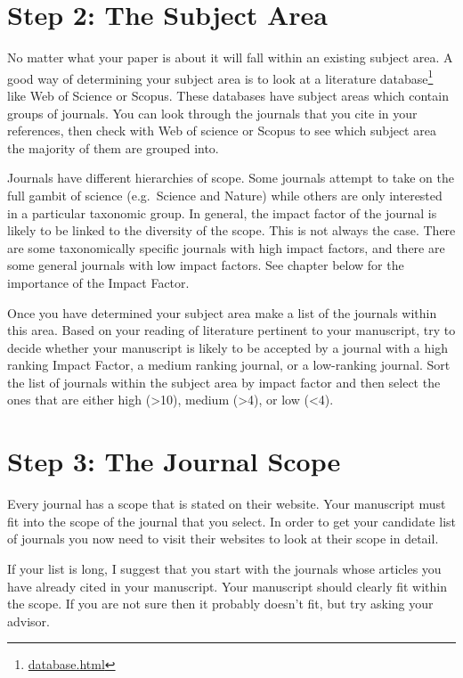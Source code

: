 \documentclass[
]{krantz}
\renewcommand{\href}[2]{#2\footnote{\url{#1}}}
\begin{document}
\hypertarget{step-2-the-subject-area}{%
\section{Step 2: The Subject Area}\label{step-2-the-subject-area}}

No matter what your paper is about it will fall within an existing subject area. A good way of determining your subject area is to look at a \href{database.html}{literature database} like Web of Science or Scopus. These databases have subject areas which contain groups of journals. You can look through the journals that you cite in your references, then check with Web of science or Scopus to see which subject area the majority of them are grouped into.

Journals have different hierarchies of scope. Some journals attempt to take on the full gambit of science (e.g.~Science and Nature) while others are only interested in a particular taxonomic group. In general, the impact factor of the journal is likely to be linked to the diversity of the scope. This is not always the case. There are some taxonomically specific journals with high impact factors, and there are some general journals with low impact factors. See chapter below for the importance of the Impact Factor.

Once you have determined your subject area make a list of the journals within this area. Based on your reading of literature pertinent to your manuscript, try to decide whether your manuscript is likely to be accepted by a journal with a high ranking Impact Factor, a medium ranking journal, or a low-ranking journal. Sort the list of journals within the subject area by impact factor and then select the ones that are either high (\textgreater10), medium (\textgreater4), or low (\textless4).

\hypertarget{step-3-the-journal-scope}{%
\section{Step 3: The Journal Scope}\label{step-3-the-journal-scope}}

Every journal has a scope that is stated on their website. Your manuscript must fit into the scope of the journal that you select. In order to get your candidate list of journals you now need to visit their websites to look at their scope in detail.

If your list is long, I suggest that you start with the journals whose articles you have already cited in your manuscript. Your manuscript should clearly fit within the scope. If you are not sure then it probably doesn't fit, but try asking your advisor.
\end{document}
